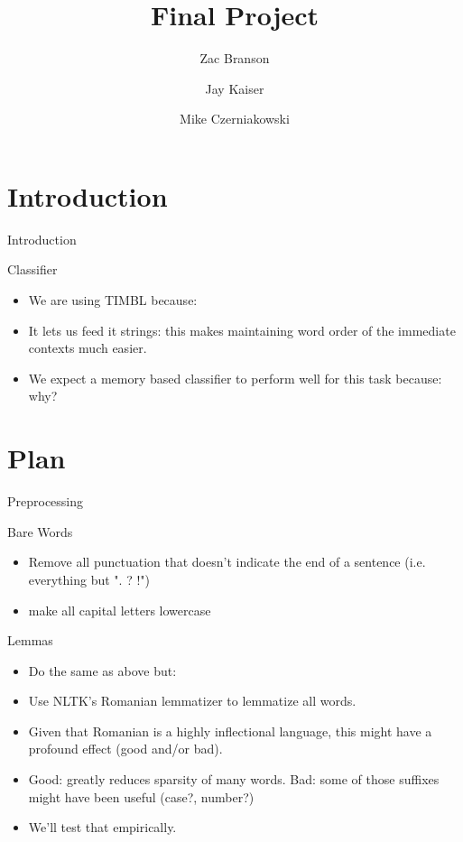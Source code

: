 \documentclass{beamer}
\title{Final Project}
\author{Zac Branson
\and Jay Kaiser
\and Mike Czerniakowski}
\begin{document}
\begin{frame}
\titlepage %
\end{frame}
\section{Introduction}
	\begin{frame}{Introduction}
		\begin{block}{Classifier}
			\begin{itemize}
		\item We are using TIMBL because:
		\item It lets us feed it strings: this makes maintaining word order of the immediate contexts much easier.
		\item We expect a memory based classifier to perform well for this task because: why?
			\end{itemize}
		\end{block}
	\end{frame}

\section{Plan}
	\begin{frame}{Preprocessing}
		\begin{block}{Bare Words}
			\begin{itemize}
		\item Remove all punctuation that doesn't indicate the end of a sentence (i.e. everything but ". ? !")
		\item make all capital letters lowercase
			\end{itemize}
		\end{block}	
		\begin{block}{Lemmas}
			\begin{itemize}
		\item Do the same as above but:
		\item Use NLTK's Romanian lemmatizer to lemmatize all words.
		\item Given that Romanian is a highly inflectional language, this might have a profound effect (good and/or bad).
		\item Good: greatly reduces sparsity of many words.  Bad: some of those suffixes might have been useful (case?, number?)
		\item We'll test that empirically.
			\end{itemize}
		\end{block}
	\end{frame}
	
\end{document}
